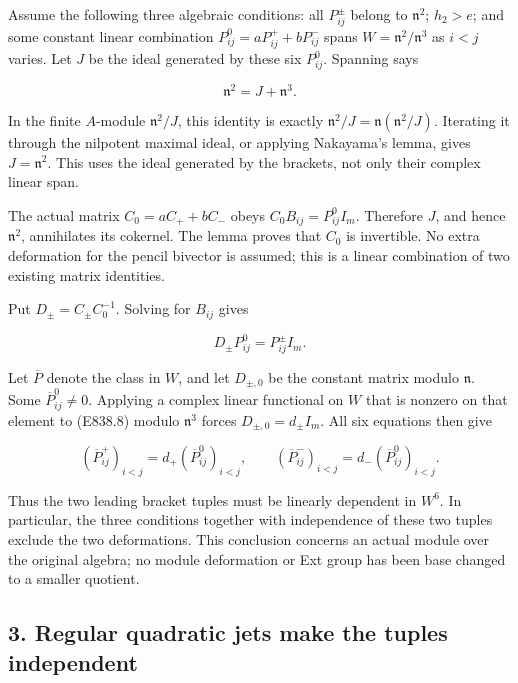 Assume the following three algebraic conditions: all \(P^\pm_{ij}\)
belong to \(\mathfrak n^2\); \(h_2>e\); and some constant linear
combination \(P^0_{ij}=aP^+_{ij}+bP^-_{ij}\) spans
\(W=\mathfrak n^2/\mathfrak n^3\) as \(i<j\) varies. Let \(J\) be the
ideal generated by these six \(P^0_{ij}\). Spanning says

\[
 \mathfrak n^2=J+\mathfrak n^3.
 \tag{E838.7}
\]

In the finite \(A\)-module \(\mathfrak n^2/J\), this identity is exactly
\(\mathfrak n^2/J=\mathfrak n(\mathfrak n^2/J)\). Iterating it through
the nilpotent maximal ideal, or applying Nakayama's lemma, gives
\(J=\mathfrak n^2\). This uses the ideal generated by the brackets, not
only their complex linear span.

The actual matrix \(C_0=aC_++bC_-\) obeys \(C_0B_{ij}=P^0_{ij}I_m\).
Therefore \(J\), and hence \(\mathfrak n^2\), annihilates its cokernel.
The lemma proves that \(C_0\) is invertible. No extra deformation for
the pencil bivector is assumed; this is a linear combination of two
existing matrix identities.

Put \(D_\pm=C_\pm C_0^{-1}\). Solving for \(B_{ij}\) gives

\[
 D_\pm P^0_{ij}=P^\pm_{ij}I_m.
 \tag{E838.8}
\]

Let \(\overline P\) denote the class in \(W\), and let \(D_{\pm,0}\) be
the constant matrix modulo \(\mathfrak n\). Some
\(\overline P^0_{ij}\ne0\). Applying a complex linear functional on
\(W\) that is nonzero on that element to (E838.8) modulo
\(\mathfrak n^3\) forces \(D_{\pm,0}=d_\pm I_m\). All six equations then
give

\[
 (\overline P^+_{ij})_{i<j}=d_+(\overline P^0_{ij})_{i<j},
 \qquad
 (\overline P^-_{ij})_{i<j}=d_-(\overline P^0_{ij})_{i<j}.
 \tag{E838.9}
\]

Thus the two leading bracket tuples must be linearly dependent in
\(W^6\). In particular, the three conditions together with independence
of these two tuples exclude the two deformations. This conclusion
concerns an actual module over the original algebra; no module
deformation or Ext group has been base changed to a smaller quotient.

\subsection{3. Regular quadratic jets make the tuples
independent}\label{SF-E838:regular-quadratic-jets-make-the-tuples-independent}

